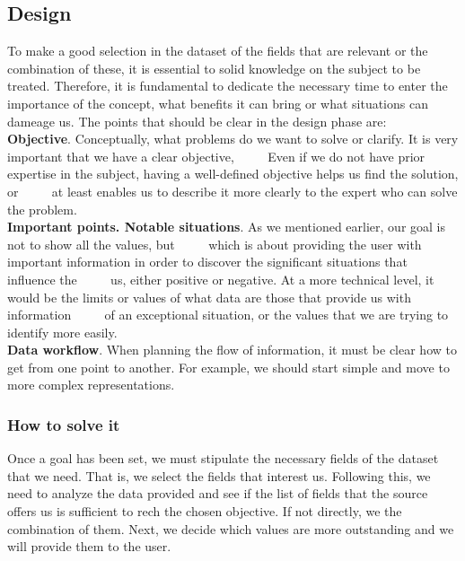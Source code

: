 \subsection{Design}
To make a good selection in the dataset of the fields that are relevant or the combination of these, it is essential to
solid knowledge on the subject to be treated. Therefore, it is fundamental to dedicate the necessary time to enter the
importance of the concept, what benefits it can bring or what situations can dameage us.
The points that should be clear in the design phase are: \\

\textbf{Objective}. Conceptually, what problems do we want to solve or clarify. It is very important that we have a clear objective,
     Even if we do not have prior expertise in the subject, having a well-defined objective helps us find the solution, or
     at least enables us to describe it more clearly to the expert who can solve the problem. \\

\textbf{Important points. Notable situations}. As we mentioned earlier, our goal is not to show all the values, but
     which is about providing the user with important information in order to discover the significant situations that influence the
     us, either positive or negative. At a more technical level, it would be the limits or values of what data are those that provide us with information
     of an exceptional situation, or the values that we are trying to identify more easily. \\

\textbf{Data workflow}. When planning the flow of information, it must be clear how to get from one point to another. For example, 
we should start simple and move to more complex representations.

\subsubsection{How to solve it} 
Once a goal has been set, we must stipulate the necessary fields of the dataset that we need. That is, we select the fields that interest us. 
Following this, we need to analyze the data provided and see if the list of fields that the source offers us is sufficient to rech the chosen objective.
If not directly, we the combination of them. Next, we decide which values are more outstanding and we will provide them to the user.

